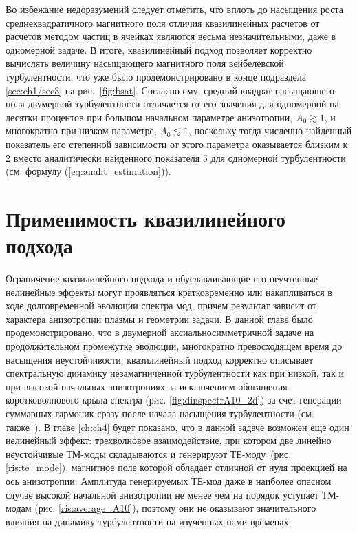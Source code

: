 Во избежание недоразумений следует отметить, что вплоть до насыщения роста среднеквадратичного магнитного поля отличия квазилинейных расчетов от расчетов методом частиц в ячейках являются весьма незначительными, даже в одномерной задаче. 
В итоге, квазилинейный подход позволяет корректно вычислять величину насыщающего магнитного поля вейбелевской турбулентности, что уже было продемонстрировано в конце подраздела \ref{sec:ch1/sec3} на рис.~\ref{fig:bsat}. 
Согласно ему, средний квадрат насыщающего поля двумерной турбулентности отличается от его значения для одномерной на десятки процентов при большом начальном параметре анизотропии, $A_0\gtrsim1$, и многократно при низком параметре, $A_0\lesssim1$, поскольку тогда численно найденный показатель его степенной зависимости от этого параметра оказывается близким к 2 вместо аналитически найденного показателя 5 для одномерной турбулентности (см. формулу (\ref{eq:analit_estimation})). 


\section{Применимость квазилинейного подхода} 
\label{sec:ch2/sec4}

Ограничение квазилинейного подхода и обуславливающие его неучтенные нелинейные эффекты могут проявляться кратковременно или накапливаться в ходе долговременной эволюции спектра мод, причем результат зависит от характера анизотропии плазмы и геометрии задачи.
В данной главе было продемонстрировано, что в двумерной аксиальносимметричной задаче на продолжительном промежутке эволюции, многократно превосходящем время до насыщения неустойчивости, квазилинейный подход корректно описывает спектральную динамику незамагниченной турбулентности как при низкой, так и при высокой начальных анизотропиях за исключением обогащения коротковолнового крыла спектра (рис. \ref{fig:dinspectrA10_2d}) за счет генерации суммарных гармоник сразу после начала насыщения турбулентности (см. также~\cite{Garasev2021}). 
В главе \ref{ch:ch4} будет показано, что в данной задаче возможен еще один нелинейный эффект: трехволновое взаимодействие, при котором две линейно неустойчивые ТМ-моды складываются и генерируют ТЕ-моду~(рис. \ref{ris:te_mode}), магнитное поле которой обладает отличной от нуля проекцией на ось анизотропии.
Амплитуда генерируемых ТЕ-мод даже в наиболее опасном случае высокой начальной анизотропии не менее чем на порядок уступает ТМ-модам (рис. \ref{ris:average_A10}), поэтому они не оказывают значительного влияния на динамику турбулентности на изученных нами временах.

